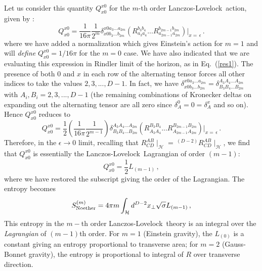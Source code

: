 \documentclass[12pt]{iopart}
\def\eq#1{{Eq.~(\ref{#1})}}
\newcommand{\LL}{Lanczos-Lovelock}
\newcommand{\Cal}[1]{\ensuremath{\mathcal{#1}}}
\newcommand{\AltC}[8]{\ensuremath{\delta^{#1 #2 #3... #4}_{#5 #6 #7
      ... #8}}}
\newcommand{\Alt}[6]{\ensuremath{\delta^{#1 #2 ... #3}_{#4 #5
      ... #6}}}
\newcommand{\Riem}[4]{\ensuremath{R^{#1 #2}_{#3 #4}}}
\begin{document}
 Let us consider this 
  quantity $Q_{x 0}^{x 0}$ for the $m$-th
order \LL\ action,  given by :
\begin{equation}
Q_{x 0}^{x 0} = \frac{1}{16\pi}\frac{1}{2^m}
\AltC{x }{0}{a_3}{a_{2m}}{x }{0}{b_3}{b_{2m}}
\left(\Riem{b_3}{b_4}{a_3}{a_4}
... \Riem{b_{2m-1}}{b_{2m}}{a_{2m-1}}{a_{2m}}\right)\Bigg|_{x =\,\epsilon}
\,. 
\label{app-ent-4}
\end{equation}
where we have added a normalization which gives Einstein's action for $m=1$ and will
 \textit{define} $Q_{x 0}^{x 0} = 1/16\pi $ for the $m=0$ case.
We have also indicated that we are evaluating this expression in Rindler limit 
of the horizon, as in \eq{res1}.
The presence of both $0$ and $x $ in each row of the alternating tensor
forces all other indices to take the values $2,3,...,D-1$. In fact, we
have $\AltC{x }{0}{a_3}{a_{2m}}{x }{0}{b_3}{b_{2m}} =
\Alt{A_3}{A_4}{A_{2m}}{B_3}{B_4}{B_{2m}}$ with $A_i, B_i =
2,3,...,D-1$ (the remaining combinations of Kronecker deltas on
expanding out the alternating tensor are all zero since
$\delta^0_A=0=\delta^x _A$ and so on). Hence $Q_{x 0}^{x 0}$
reduces to 
\begin{equation}
Q_{x 0}^{x 0} =
\frac{1}{2}\left(\frac{1}{16\pi}\frac{1}{2^{m-1}}\right) 
\Alt{A_3}{A_4}{A_{2m}}{B_3}{B_4}{B_{2m}}
\left(\Riem{B_3}{B_4}{A_3}{A_4}
... \Riem{B_{2m-1}}{B_{2m}}{A_{2m-1}}{A_{2m}}\right)\Bigg|_{x =\,\epsilon}
\,. 
\label{app-ent-5}
\end{equation}
Therefore, in the $\epsilon\to 0$ limit, recalling that
$\Riem{A}{B}{C}{D}\mid_\Cal{H}
=\,^{(D-2)}\Riem{A}{B}{C}{D}\mid_\Cal{H}$, we find that $Q_{x 0}^{x 0}$ is essentially the \LL\ Lagrangian of order $(m-1)$:
\begin{equation}
Q_{x 0}^{x 0}=
\frac{1}{2}{L}_{(m-1)}\,,
\label{app-ent-6}
\end{equation} 
where we have restored the subscript  giving the order of the Lagrangian.
The entropy  becomes
\begin{equation}
S^{(m)}_{\rm Noether} =  4\pi m
\int_{\Cal{H}}{d^{D-2}x_{\perp}\sqrt{\sigma}{L}_{(m-1)}}
\,,   
\label{app-ent-8}
\end{equation}
 This  entropy in the $m-$th order \LL\ theory is an integral over the \textit{Lagrangian} of $(m-1)$th order. For $m=1$ (Einstein gravity),
the $L_{(0)}$  is a constant giving an entropy proportional to transverse area; for $m=2 $ (Gauss-Bonnet gravity), the entropy is proportional to  integral of $R$ over transverse direction. 
\end{document}
